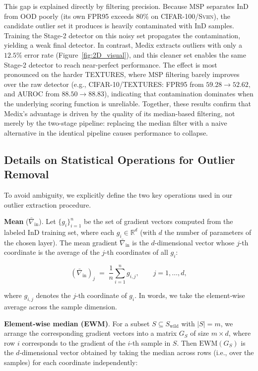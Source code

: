 \documentclass[10pt]{article} %
\theoremstyle{plain}
\theoremstyle{definition}
\begin{document}
This gap is explained directly by filtering precision. Because MSP separates InD from OOD poorly (its own FPR95 exceeds $80\%$ on CIFAR-100/\textsc{Svhn}), the candidate outlier set it produces is heavily contaminated with InD samples. Training the Stage-2 detector on this noisy set propagates the contamination, yielding a weak final detector. In contrast, Medix extracts outliers with only a $12.5\%$ error rate (Figure~\ref{fig:2D_visual}), and this cleaner set enables the same Stage-2 detector to reach near-perfect performance. The effect is most pronounced on the harder \textsc{TEXTURES}, where MSP filtering barely improves over the raw detector (e.g., CIFAR-10/\textsc{TEXTURES}: FPR95 from $59.28 \rightarrow 52.62$, and AUROC from $88.50 \rightarrow 88.83$), indicating that contamination dominates when the underlying scoring function is unreliable. Together, these results confirm that Medix's advantage is driven by the quality of its median-based filtering, not merely by the two-stage pipeline: replacing the median filter with a naive alternative in the identical pipeline causes performance to collapse. 



\subsection{Details on Statistical Operations for Outlier Removal}
\label{appendix:dimension_clear}

To avoid ambiguity, we explicitly define the two key operations used in our outlier extraction procedure.

\textbf{Mean} (\(\bar{\nabla}_{\text{in}}\)). 
Let \(\{g_i\}_{i=1}^{n}\) be the set of gradient vectors computed from the labeled InD training set, where each \(g_i \in \mathbb{R}^d\) (with \(d\) the number of parameters of the chosen layer). The mean gradient \(\bar{\nabla}_{\text{in}}\) is the \(d\)-dimensional vector whose \(j\)-th coordinate is the average of the \(j\)-th coordinates of all \(g_i\):

\[
(\bar{\nabla}_{\text{in}})_j \;=\; \frac{1}{n} \sum_{i=1}^{n} g_{i,j}, \qquad j = 1,\dots,d,
\]

where \(g_{i,j}\) denotes the \(j\)-th coordinate of \(g_i\). In words, we take the element‑wise average across the sample dimension.

\textbf{Element‑wise median (EWM)}.
For a subset \(S \subseteq S_{\text{wild}}\) with \(|S| = m\), we arrange the corresponding gradient vectors into a matrix \(G_S\) of size \(m \times d\), where row \(i\) corresponds to the gradient of the \(i\)-th sample in \(S\). Then \(\text{EWM}(G_S)\) is the \(d\)-dimensional vector obtained by taking the median across rows (i.e., over the samples) for each coordinate independently:
\end{document}
